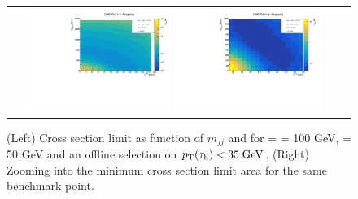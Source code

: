 \begin{figure}[tbh!]
	\centering
	\begin{tabular}{cc}
		\includegraphics[width=0.45\textwidth]{analysis/pics/JetInvMass_vs_MET_xsec_chi100_lsp050_taupt35.pdf}
		\includegraphics[width=0.45\textwidth]{analysis/pics/JetInvMass_vs_MET_xsec_chi100_lsp050_taupt35_zoom.pdf}
	\end{tabular}
	\caption{(Left) Cross section limit as function of $m_{jj}$ and \met for \charginopm = \neutralinotwo = 100 GeV, \neutralinoone = 50 GeV and an offline selection on $p_{\text{T}}(\tau_{\text{h}}) <  35\;\text{Ge}\kern-0.06667em\text{V}$. (Right) Zooming into the minimum cross section limit area for the same benchmark point.}
	\label{fig::JetInvMass_vs_MET_xsec_chi100_lsp050_taupt35}
\end{figure}

